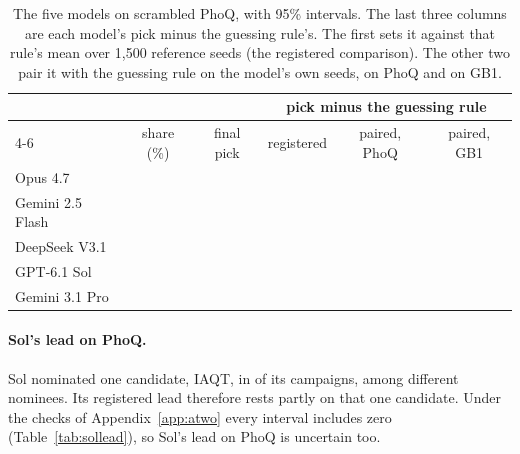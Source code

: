 \begin{table}[tbp]
\centering
\small
\caption{The five models on scrambled PhoQ, with 95\% intervals. The last three columns are each model's pick minus the guessing rule's. The first sets it against that rule's mean over 1{,}500 reference seeds (the registered comparison). The other two pair it with the guessing rule on the model's own seeds, on PhoQ and on GB1.}
\label{tab:phoq}
\begin{tabular}{lccccc}
\toprule
 & & & \multicolumn{3}{c}{pick minus the guessing rule} \\
\cmidrule(lr){4-6}
 & share (\%) & final pick & registered & paired, PhoQ & paired, GB1 \\
\midrule
Opus 4.7 & \estci{\nPqShareOpus}{\nPqShareOpusci} & \estci{\nPqPickOpus}{\nPqPickOpusci} & \estci{\nPqLeadOpus}{\nPqLeadOpusci} & \estci{\nPairPqOpus}{\nPairPqOpusci} & \estci{\nPairGbOpus}{\nPairGbOpusci} \\
Gemini 2.5 Flash & \estci{\nPqShareFlash}{\nPqShareFlashci} & \estci{\nPqPickFlash}{\nPqPickFlashci} & \estci{\nPqLeadFlash}{\nPqLeadFlashci} & \estci{\nPairPqFlash}{\nPairPqFlashci} & \estci{\nPairGbFlash}{\nPairGbFlashci} \\
DeepSeek V3.1 & \estci{\nPqShareDeep}{\nPqShareDeepci} & \estci{\nPqPickDeep}{\nPqPickDeepci} & \estci{\nPqLeadDeep}{\nPqLeadDeepci} & \estci{\nPairPqDeep}{\nPairPqDeepci} & \estci{\nPairGbDeep}{\nPairGbDeepci} \\
GPT-6.1 Sol & \estci{\nPqShareSol}{\nPqShareSolci} & \estci{\nPqPickSol}{\nPqPickSolci} & \estci{\nPqLeadSol}{\nPqLeadSolci} & \estci{\nPairPqSol}{\nPairPqSolci} & \estci{\nPairGbSol}{\nPairGbSolci} \\
Gemini 3.1 Pro & \estci{\nPqSharePro}{\nPqShareProci} & \estci{\nPqPickPro}{\nPqPickProci} & \estci{\nPqLeadPro}{\nPqLeadProci} & \estci{\nPairPqPro}{\nPairPqProci} & \estci{\nPairGbPro}{\nPairGbProci} \\
\bottomrule
\end{tabular}
\end{table}

\paragraph{Sol's lead on PhoQ.} Sol nominated one candidate, IAQT, in \nPqTopSol{} of its campaigns, among
\nPqSolDistinctNominees{} different nominees. Its registered lead
therefore rests partly on that one candidate. Under the checks of Appendix~\ref{app:atwo} every interval includes zero
(Table~\ref{tab:sollead}), so Sol's lead on PhoQ is uncertain too.

